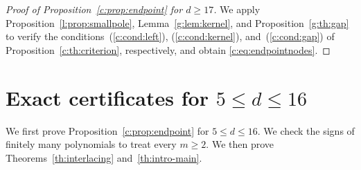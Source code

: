 \documentclass[11pt]{article}
\numberwithin{equation}{section}
\theoremstyle{remark}\newtheorem{remark}[theorem]{Remark}
\begin{document}
\begin{proof}[Proof of Proposition~\ref{c:prop:endpoint} for $d\ge17$]
We apply Proposition~\ref{l:prop:smallpole},
Lemma~\ref{g:lem:kernel}, and Proposition~\ref{g:th:gap} to verify the
conditions~(\ref{c:cond:left}), (\ref{c:cond:kernel}), and~(\ref{c:cond:gap})
of Proposition~\ref{c:th:criterion}, respectively, and obtain
\eqref{c:eq:endpointnodes}.
\end{proof}

\section{Exact certificates for \texorpdfstring{$5\le d\le16$}{5 <= d <= 16}}\label{sec:lowranks}
We first prove Proposition~\ref{c:prop:endpoint} for $5\le d\le16$.
We check the signs of finitely many polynomials to treat every $m\ge2$.
We then prove Theorems~\ref{th:interlacing} and~\ref{th:intro-main}.
\end{document}
